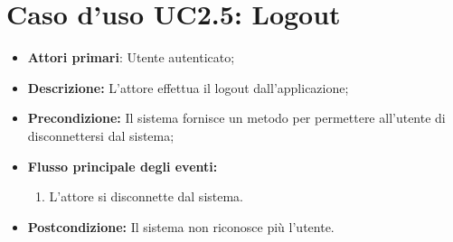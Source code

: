 \section{Caso d'uso UC2.5: Logout }
\begin{itemize}
	\item \textbf{Attori primari}: Utente autenticato;
	\item \textbf{Descrizione:} L'attore effettua il logout dall'applicazione;
	\item \textbf{Precondizione:} Il sistema fornisce un metodo per permettere all'utente di disconnettersi dal sistema;
	\item \textbf{Flusso principale degli eventi:}
	\begin{enumerate}
		\item L'attore si disconnette dal sistema.
	\end{enumerate}
	\item \textbf{Postcondizione:} Il sistema non riconosce più l'utente.
\end{itemize}

